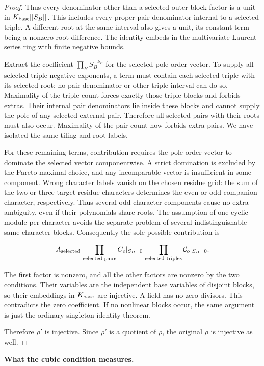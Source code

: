 \documentclass[11pt,a4paper]{article}
\theoremstyle{definition}
\begin{document}
\begin{proof}
Thus every denominator other than a selected outer block factor is a unit in \(K_{\rm base}[[S_B]]\). This includes every proper pair denominator internal to a selected triple. A different root at the same interval also gives a unit, its constant term being a nonzero root difference. The identity embeds in the multivariate Laurent-series ring with finite negative bounds.

Extract the coefficient \(\prod_B S_B^{-k_B}\) for the selected pole-order vector. To supply all selected triple negative exponents, a term must contain each selected triple with its selected root: no pair denominator or other triple interval can do so. Maximality of the triple count forces exactly those triple blocks and forbids extras. Their internal pair denominators lie inside these blocks and cannot supply the pole of any selected external pair. Therefore all selected pairs with their roots must also occur. Maximality of the pair count now forbids extra pairs. We have isolated the same tiling and root labels.

For these remaining terms, contribution requires the pole-order vector to dominate the selected vector componentwise. A strict domination is excluded by the Pareto-maximal choice, and any incomparable vector is insufficient in some component. Wrong character labels vanish on the chosen residue grid: the sum of the two or three target residue characters determines the even or odd companion character, respectively. Thus several odd character components cause no extra ambiguity, even if their polynomials share roots. The assumption of one cyclic module per character avoids the separate problem of several indistinguishable same-character blocks. Consequently the sole possible contribution is

\[
A_{\rm selected}\,
\prod_{\text{selected pairs}}C_e|_{S_B=0}\,
\prod_{\text{selected triples}}\mathcal C_o|_{S_B=0}.
\]

The first factor is nonzero, and all the other factors are nonzero by the two conditions. Their variables are the independent base variables of disjoint blocks, so their embeddings in \(K_{\rm base}\) are injective. A field has no zero divisors. This contradicts the zero coefficient. If no nonlinear blocks occur, the same argument is just the ordinary singleton identity theorem.

Therefore \(\rho'\) is injective. Since \(\rho'\) is a quotient of \(\rho\), the original \(\rho\) is injective as well.

\end{proof}
\par\medskip\noindent\textbf{What the cubic condition measures.}
\end{document}
